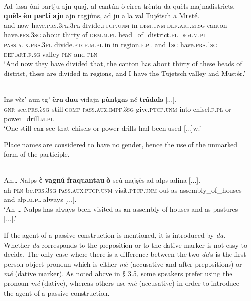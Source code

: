 \ea
\label{ex:pass.stat2}
\\
\gll Ad ùssa òni partju ajn quaj, al cantún ò circa trènta da quèls majnadistricts, \textbf{quèls} \textbf{èn} \textbf{partí} \textbf{ajn} ajn ragjúns, ad ju a la val Tujétsch a Musté.\\
and now have.\textsc{prs.3pl.3pl} divide.\textsc{ptcp.unm} in \textsc{dem.unm} \textsc{def.art.m.sg} canton  have.\textsc{prs.3sg} about thirty of \textsc{dem.m.pl} head\_of\_district.\textsc{pl} \textsc{dem.m.pl} \textsc{pass.aux.prs.3pl} divide.\textsc{ptcp.m.pl} in in region.\textsc{f.pl} and \textsc{1sg} have.\textsc{prs.1sg} \textsc{def.art.f.sg} valley \textsc{pln} and \textsc{pln}\\
\glt `And now they have divided that, the canton has about thirty of these heads of district, these are divided in regions, and I have the Tujetsch valley and Mustér.'
\z

\ea
\label{ex:passs.stat3}
\\
\gll Ins vèz’ aun tg’ \textbf{èra} \textbf{dau} vidajn \textbf{pùntgas} né \textbf{trádals} [...].   \\
\textsc{gnr} see.\textsc{prs.3sg} still \textsc{comp} \textsc{pass.aux.impf.3sg} give.\textsc{ptcp.unm} into chisel.\textsc{f.pl} or power\_drill.\textsc{m.pl}\\
\glt `One still can see that chisels or power drills had been used [...]w.'
\z

Place names are considered to have no gender, hence the use of the unmarked form of the participle.

\ea
\label{ex:pass.dyn6}
\\
\gll Ah… Nalps \textbf{è} \textbf{vagnú} \textbf{fraquantau} \textbf{ò} scù majṣès ad alps adina [...].\\
ah  \textsc{pln}  be.\textsc{prs.3sg} \textsc{pass.aux.ptcp.unm} visit.\textsc{ptcp.unm} out as assembly\_of\_houses and alp.\textsc{m.pl} always [...].\\
\glt `Ah … Nalps has always been visited as an assembly of houses and as pastures [...].'
\z

If the agent of a passive construction is mentioned, it is introduced by \textit{da}. Whether \textit{da} corresponds to the preposition or to the dative marker is not easy to decide. The only case where there is a difference between the two \textit{da}'s is the first person object pronoun which is either \textit{mè} (accusative and after prepositions) or \textit{mé} (dative marker). As noted above in § 3.5, some speakers prefer using the pronoun \textit{mé} (dative), whereas others use \textit{mè} (accusative) in order to introduce the agent of a passive construction.

